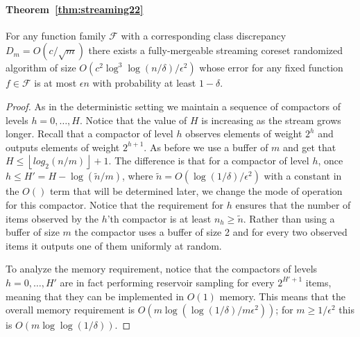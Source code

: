 \documentclass[anon,12pt]{colt2019} %
\newcommand{\eps}{\epsilon}
\newcommand{\F}{\mathcal{F}}
\newcommand{\floor}[1]{\left \lfloor #1 \right \rfloor}
\begin{document}
{\paragraph{Theorem~\ref{thm:streaming22}}
For any function family $\F$ with a corresponding class discrepancy $D_m = O(c/\sqrt{m})$ there exists a fully-mergeable streaming coreset randomized algorithm of size $O\left(c^2\log^3\log(n/\delta) /\eps^2\right)$ whose error for any fixed function $f \in \F$ is at most $\eps n$ with probability at least $1-\delta$. 
\begin{proof}
As in the deterministic setting we maintain a sequence of compactors of levels $h=0,\ldots,H$. Notice that the value of $H$ is increasing as the stream grows longer. Recall that a compactor of level $h$ observes elements of weight $2^h$ and outputs elements of weight $2^{h+1}$. As before we use a buffer of $m$ and get that $H \leq  \floor{log_2(n/m)}+1$.
The difference is that for a compactor of level $h$, once $h \leq H' = H - \log(\tilde{n}/m)$, where $\tilde{n} = O(\log(1/\delta)/\eps^2)$ with a constant in the $O()$ term that will be determined later, we change the mode of operation for this compactor. Notice that the requirement for $h$ ensures that the number of items observed by the $h$'th compactor is at least $n_h \geq \tilde{n}$. Rather than using a buffer of size $m$ the compactor uses a buffer of size 2 and for every two observed items it outputs one of them uniformly at random.

To analyze the memory requirement, notice that the compactors of levels $h=0,\ldots,H'$ are in fact performing reservoir sampling for every $2^{H'+1}$ items, meaning that they can be implemented in $O(1)$ memory. This means that the overall memory requirement is $O(m\log(\log(1/\delta)/m\eps^2))$; for $m \geq 1/\eps^2$ this is $O(m\log\log(1/\delta))$. 


\end{proof}}
\end{document}
